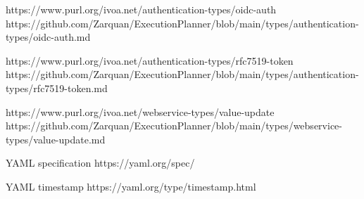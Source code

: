 \documentclass[11pt,a4paper]{ivoa}
\begin{document}
https://www.purl.org/ivoa.net/authentication-types/oidc-auth
https://github.com/Zarquan/ExecutionPlanner/blob/main/types/authentication-types/oidc-auth.md

https://www.purl.org/ivoa.net/authentication-types/rfc7519-token
https://github.com/Zarquan/ExecutionPlanner/blob/main/types/authentication-types/rfc7519-token.md

https://www.purl.org/ivoa.net/webservice-types/value-update
https://github.com/Zarquan/ExecutionPlanner/blob/main/types/webservice-types/value-update.md

YAML specification
https://yaml.org/spec/

YAML timestamp
https://yaml.org/type/timestamp.html


\end{document}
